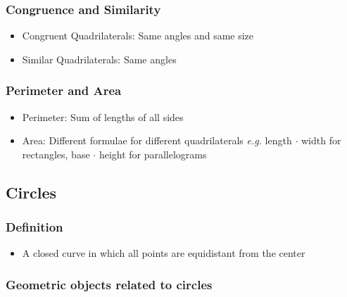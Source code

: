 \documentclass{article}
\begin{document}
        \subsubsection{Congruence and Similarity}
            \begin{itemize}
                \item Congruent Quadrilaterals: Same angles and same size
                \item Similar Quadrilaterals: Same angles
            \end{itemize}

        \subsubsection{Perimeter and Area}
            \begin{itemize}
                \item Perimeter: Sum of lengths of all sides
                \item Area: Different formulae for different quadrilaterals
                \subitem \textit{e.g.} length $\cdot$ width for rectangles, base $\cdot$ height for parallelograms
            \end{itemize}
    
    \subsection{Circles}
    
        \subsubsection{Definition}
            \begin{itemize}
                \item A closed curve in which all points are equidistant from the center
            \end{itemize}
        
        \subsubsection{Geometric objects related to circles}
\end{document}

